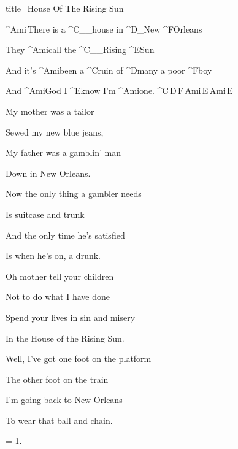 \begin{song}{title=\predtitle\centering House Of The Rising Sun \\\large \vspace*{-0.3cm}}  %
\begin{centerjustified}
\nejvetsi

\sloka 
	^{Ami\,}There is a ^{C{\color{white}\_\_}}house in ^{D{\color{white}\_}}New ^{F}Orleans

	They ^{Ami}call the ^{C{\color{white}\_\_}}Rising ^{E}Sun

	And it's ^{Ami}been a ^{C}ruin of ^{D}many a poor ^{F}boy

	And ^{Ami}God I ^{E}know I'm ^{Ami}one. ^{C\,D\,F\,Ami\,E\,Ami\,E}

\sloka
	My mother was a tailor
	
	Sewed my new blue jeans,
	
	My father was a gamblin' man
   	
   	Down in New Orleans.

\sloka
	Now the only thing a gambler needs

	Is suitcase and trunk

	And the only time he's satisfied

	Is when he's on, a drunk.

\sloka
	Oh mother tell your children

	Not to do what I have done

	Spend your lives in sin and misery

	In the House of the Rising Sun.

\sloka
	Well, I've got one foot on the platform

	The other foot on the train

	I'm going back to New Orleans

	To wear that ball and chain.

\sloka = 1.


\end{centerjustified}
\setcounter{Slokočet}{0}
\end{song}

